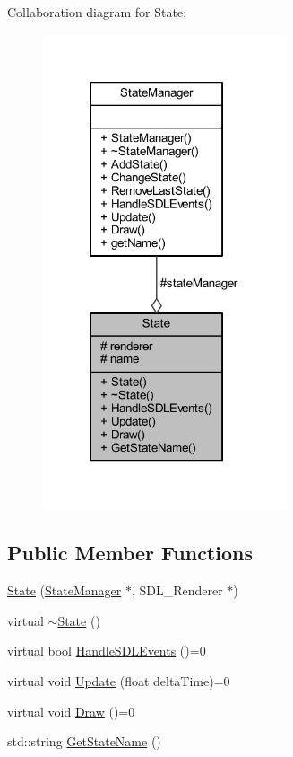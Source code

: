 Collaboration diagram for State\+:
\nopagebreak
\begin{figure}[H]
\begin{center}
\leavevmode
\includegraphics[width=203pt]{class_state__coll__graph}
\end{center}
\end{figure}
\subsection*{Public Member Functions}
\begin{DoxyCompactItemize}
\item 
\hyperlink{class_state_abd80317215e3d5a83becc409050dd22f}{State} (\hyperlink{class_state_manager}{State\+Manager} $\ast$, S\+D\+L\+\_\+\+Renderer $\ast$)
\item 
virtual \hyperlink{class_state_afab438d92b90dc18d194dbd9c9c8bab3}{$\sim$\+State} ()
\item 
virtual bool \hyperlink{class_state_a648d9182cab9aeb914ef778f94e2b437}{Handle\+S\+D\+L\+Events} ()=0
\item 
virtual void \hyperlink{class_state_a770f40188fdfc64bc95a5166fef12e02}{Update} (float delta\+Time)=0
\item 
virtual void \hyperlink{class_state_a8b0cdb0e7450a9bb3580a33dfbe4d981}{Draw} ()=0
\item 
std\+::string \hyperlink{class_state_ab7a5d1c1837b4b44b3563897777fcb26}{Get\+State\+Name} ()
\end{DoxyCompactItemize}
